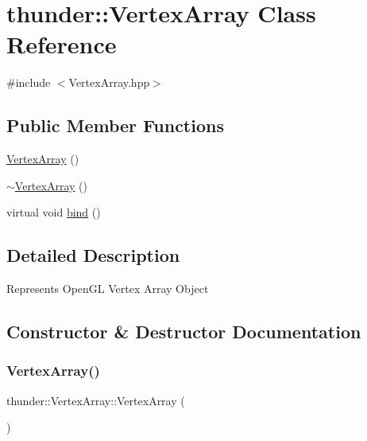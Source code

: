\hypertarget{classthunder_1_1_vertex_array}{}\section{thunder\+:\+:Vertex\+Array Class Reference}
\label{classthunder_1_1_vertex_array}


{\ttfamily \#include $<$Vertex\+Array.\+hpp$>$}

\subsection*{Public Member Functions}
\begin{DoxyCompactItemize}
\item 
\mbox{\hyperlink{classthunder_1_1_vertex_array_a2d0c390bd0dcf87f24162528e8a817d8}{Vertex\+Array}} ()
\item 
\mbox{\hyperlink{classthunder_1_1_vertex_array_aa63130e78454cd2ad4bd956c052a4e8d}{$\sim$\+Vertex\+Array}} ()
\item 
virtual void \mbox{\hyperlink{classthunder_1_1_vertex_array_ac2b471ab36646b1764bf2c27444fd871}{bind}} ()
\end{DoxyCompactItemize}


\subsection{Detailed Description}
Represents Open\+GL Vertex Array Object 

\subsection{Constructor \& Destructor Documentation}
\mbox{\label{classthunder_1_1_vertex_array_a2d0c390bd0dcf87f24162528e8a817d8}} 
\subsubsection{\texorpdfstring{Vertex\+Array()}{VertexArray()}}
{\footnotesize\ttfamily thunder\+::\+Vertex\+Array\+::\+Vertex\+Array (\begin{DoxyParamCaption}{ }\end{DoxyParamCaption})}


